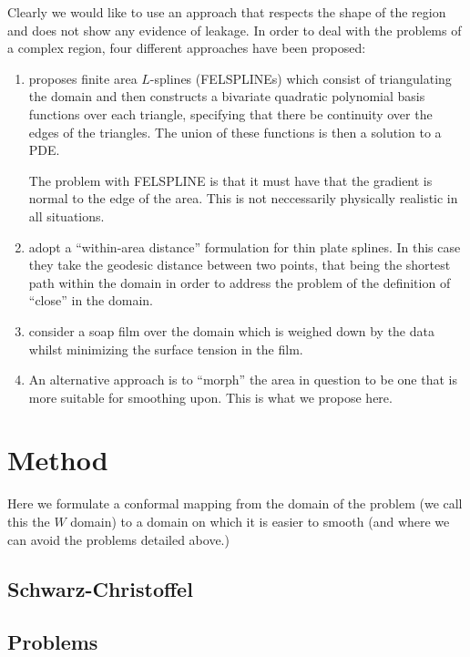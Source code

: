\documentclass[a4paper,10pt]{amsart}
\newcommand{\sch}{Schwarz-Christoffel }
\begin{document}
Clearly we would like to use an approach that respects the shape of the region and does not show any evidence of leakage. In order to deal with the problems of a complex region, four different approaches have been proposed:

\begin{enumerate}
\item \cite{ramsay} proposes finite area $L$-splines (FELSPLINEs) which consist of triangulating the domain and then constructs a bivariate quadratic polynomial basis functions over each triangle, specifying that there be continuity over the edges of the triangles. The union of these functions is then a solution to a PDE.

The problem with FELSPLINE is that it must have that the gradient is normal to the edge of the area. This is not neccessarily physically realistic in all situations.

\item \cite{wangranalli} adopt a ``within-area distance'' formulation for thin plate splines. In this case they take the geodesic distance between two points, that being the shortest path within the domain in order to address the problem of the definition of ``close'' in the domain. 

\item \cite{soap} consider a soap film over the domain which is weighed down by the data whilst minimizing the surface tension in the film.

\item An alternative approach is to ``morph'' the area in question to be one that is more suitable for smoothing upon. This is what we propose here.

\end{enumerate}




\section{Method}

Here we formulate a conformal mapping from the domain of the problem (we call this the $W$ domain) to a domain on which it is easier to smooth (and where we can avoid the problems detailed above.)

\subsection{\sch}


\subsection{Problems}
\end{document}
